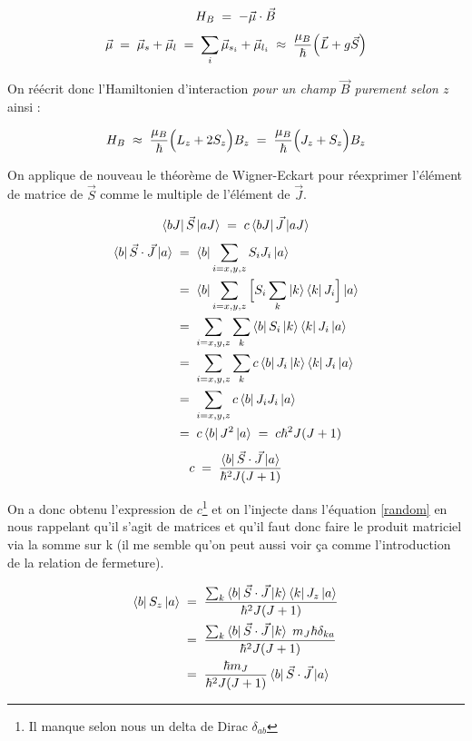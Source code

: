 \[
    H_B \; = \; -\vec{\mu} \cdot \vec{B}
\]
\[
    \vec{\mu} \; = \; \vec{\mu}_{s} + \vec{\mu}_{l} \; = \; \sum_i \vec{\mu}_{s_i} + \vec{\mu}_{l_i} \; \approx \; \dfrac{\mu_B}{\hbar}\Big( \vec{L} + g\vec{S}\Big)
\]

On réécrit donc l'Hamiltonien d'interaction \emph{pour un champ $\vec{B}$ purement selon $z$} ainsi :

\[
    H_B \;\approx\; \dfrac{\mu_B}{\hbar}\Big( L_z + 2 S_z\Big)B_z \; = \; \dfrac{\mu_B}{\hbar}\Big( J_z + S_z\Big)B_z
\]

On applique de nouveau le théorème de Wigner-Eckart pour réexprimer l'élément de matrice de $\vec{S}$ comme le multiple de l'élément de $\vec{J}$.

\begin{equation}
    \bra{bJ}\vec{S}\ket{aJ} \; = \; c \bra{bJ}\vec{J}\ket{aJ}
    \label{random}
\end{equation}
\begin{align*}
    \bra{b}\vec{S}\cdot\vec{J}\ket{a}
    &\; = \;
    \bra{b} \sum_{i=x,y,z}S_i J_i\ket{a} \\
    &\; = \;
    \bra{b} \sum_{i=x,y,z} \Big[ S_i \sum_k \ket{k}\bra{k} J_i \Big] \ket{a} \\
    &\; = \;
    \sum_{i=x,y,z} \sum_k \bra{b}S_i\ket{k} \bra{k}J_i\ket{a} \\
    &\; = \;
    \sum_{i=x,y,z} \sum_k c\bra{b}J_i\ket{k} \bra{k}J_i\ket{a} \\
    &\; = \;
    \sum_{i=x,y,z} c\bra{b}J_iJ_i\ket{a} \\
    &\; = \;
    c\bra{b}J^2\ket{a} \; = \; c \hbar^2 J(J+1)
\end{align*}
\[
    c \; = \; \dfrac{\bra{b}\vec{S}\cdot\vec{J}\ket{a}}{\hbar^2 J(J+1)}
\]

On a donc obtenu l'expression de $c$\footnote{Il manque selon nous un delta de Dirac $\delta_{ab}$} et on l'injecte dans l'équation \ref{random} en nous rappelant qu'il s'agit de matrices et qu'il faut donc faire le produit matriciel via la somme sur k (il me semble qu'on peut aussi voir ça comme l'introduction de la relation de fermeture).

\begin{align*}
    \bra{b}S_z\ket{a}
    &\; = \;
    \dfrac{\sum_k \bra{b}\vec{S}\cdot\vec{J}\ket{k}\bra{k}J_z\ket{a}}{\hbar^2 J(J+1)}\\
     &\; = \;
    \dfrac{\sum_k \bra{b}\vec{S}\cdot\vec{J} \ket{k} \; m_J\hbar \delta_{ka}}{\hbar^2 J(J+1)}\\
    &\; = \;
    \dfrac{\hbar m_J}{\hbar^2 J(J+1)} \bra{b}\vec{S}\cdot\vec{J}\ket{a}
\end{align*}

